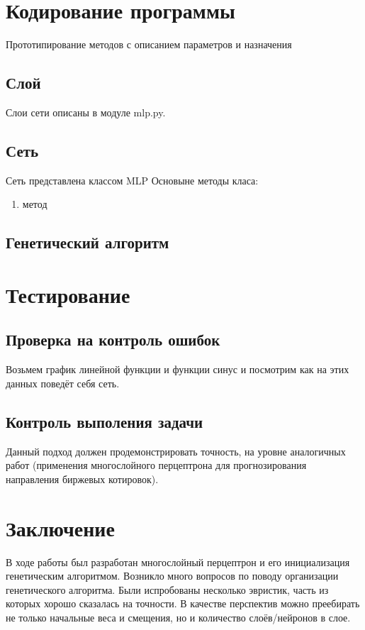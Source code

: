 \documentclass[a4paper,12pt]{article}
\begin{document}
\newpage\section{Кодирование программы}
Прототипирование методов с описанием параметров и назначения

\subsection{Слой}
Слои сети описаны в модуле mlp.py.

\subsection{Сеть}
Сеть представлена классом MLP
Основыне методы класа:

\begin{enumerate}
\item метод
\end{enumerate}

\subsection{Генетический алгоритм}

\newpage\section{Тестирование}
\subsection{Проверка на контроль ошибок}
Возьмем график линейной функции и функции синус и посмотрим как на этих данных поведёт себя сеть.

\subsection{Контроль выполения задачи}
Данный подход должен продемонстрировать точность, на уровне аналогичных работ (применения многослойного перцептрона для прогнозирования направления биржевых котировок).

\newpage\section*{Заключение}
В ходе работы был разработан многослойный перцептрон и его инициализация генетическим алгоритмом. Возникло много вопросов по поводу организации генетического алгоритма. Были испробованы несколько эвристик, часть из которых хорошо сказалась на точности. В качестве перспектив можно преебирать не только начальные веса и смещения, но и количество слоёв/нейронов в слое.
\end{document}
